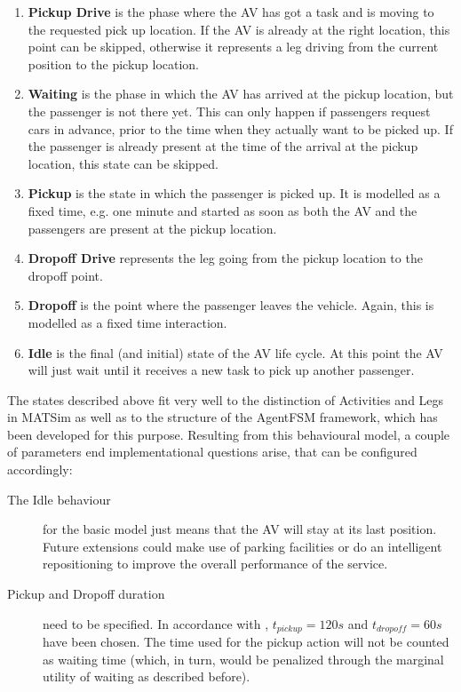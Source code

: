 \begin{enumerate}
\item \textbf{Pickup Drive} is the phase where the AV has got a task and is moving
to the requested pick up location. If the AV is already at the right location, this
point can be skipped, otherwise it represents a leg driving from the current position
to the pickup location.
\item \textbf{Waiting} is the phase in which the AV has arrived at the pickup
location, but the passenger is not there yet. This can only happen if passengers
request cars in advance, prior to the time when they actually want to be picked
up. If the passenger is already present at the time of the arrival at the pickup
location, this state can be skipped.
\item \textbf{Pickup} is the state in which the passenger is picked up. It is
modelled as a fixed time, e.g. one minute and started as soon as both the AV
and the passengers are present at the pickup location.
\item \textbf{Dropoff Drive} represents the leg going from the pickup location to
the dropoff point.
\item \textbf{Dropoff} is the point where the passenger leaves the vehicle. Again,
this is modelled as a fixed time interaction.
\item \textbf{Idle} is the final (and initial) state of the AV life cycle. At this
point the AV will just wait until it receives a new task to pick up another passenger.
\end{enumerate}

The states described above fit very well to the distinction of Activities and Legs
in MATSim as well as to the structure of the AgentFSM framework, which has been
developed for this purpose. Resulting from this behavioural model, a couple of
parameters end implementational questions arise, that can be configured accordingly:

\begin{description}
\item[The Idle behaviour] for the basic model just means that the AV will stay at
its last position. Future extensions could make use of parking facilities or do
an intelligent repositioning to improve the overall performance of the service.

\item[Pickup and Dropoff duration] need to be specified. In accordance with
, $t_{pickup} = 120s$ and $t_{dropoff} = 60s$ have been chosen. The time
used for the pickup action will not be counted as waiting time (which, in turn,
would be penalized through the marginal utility of waiting as described before).
\end{description}

